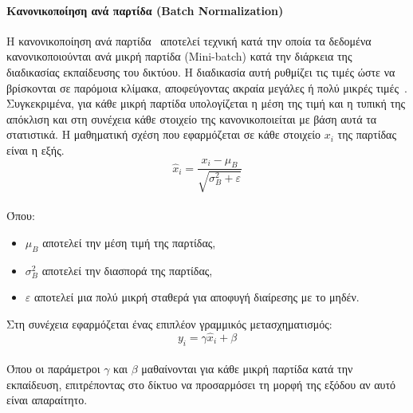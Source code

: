 \documentclass[12pt]{article}
\numberwithin{equation}{section}
\begin{document}
\paragraph{Κανονικοποίηση ανά παρτίδα (Batch Normalization) \\ [0.5cm]}

Η κανονικοποίηση ανά παρτίδα~\cite{ioffe2015batchnormalizationacceleratingdeep} αποτελεί τεχνική κατά την οποία τα δεδομένα κανονικοποιούνται ανά μικρή παρτίδα (Mini-batch) κατά την διάρκεια της διαδικασίας εκπαίδευσης του δικτύου. Η διαδικασία αυτή ρυθμίζει τις τιμές ώστε να βρίσκονται σε παρόμοια κλίμακα, αποφεύγοντας ακραία μεγάλες ή πολύ μικρές τιμές~\cite{lian2018revisitbatchnormalizationnew}. Συγκεκριμένα, για κάθε μικρή παρτίδα υπολογίζεται η μέση της τιμή και η τυπική της απόκλιση και στη συνέχεια κάθε στοιχείο της κανονικοποιείται με βάση αυτά τα στατιστικά. Η μαθηματική σχέση που εφαρμόζεται σε κάθε στοιχείο \( x_i \) της παρτίδας είναι η εξής.\\

\begin{equation}
\hat{x}_i = \frac{x_i - \mu_B}{\sqrt{\sigma_B^2 + \varepsilon}}
\end{equation}\\

\noindent Όπου:

\begin{itemize}
    \item \( \mu_B \) αποτελεί την μέση τιμή της παρτίδας,
    \item \( \sigma_B^2 \) αποτελεί την διασπορά της παρτίδας,
    \item \( \varepsilon \) αποτελεί μια πολύ μικρή σταθερά για αποφυγή διαίρεσης με το μηδέν.\\
    
\end{itemize}

\noindent Στη συνέχεια εφαρμόζεται ένας επιπλέον γραμμικός μετασχηματισμός:\\

\begin{equation}
y_i = \gamma \hat{x}_i + \beta
\end{equation}\\

\noindent Όπου οι παράμετροι \( \gamma \) και \( \beta \) μαθαίνονται για κάθε μικρή παρτίδα κατά την εκπαίδευση, επιτρέποντας στο δίκτυο να προσαρμόσει τη μορφή της εξόδου αν αυτό είναι απαραίτητο.\\
\end{document}
